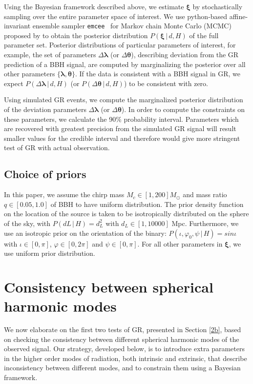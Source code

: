 \documentclass[prd,preprintnumbers,twocolumn,eqsecnum,floatfix,a4paper,nofootinbib,superscriptaddress]{revtex4}
\newcommand{\blambda}{\bm{\lambda}}
\newcommand{\btheta}{\bm{\theta}}
\newcommand{\bxi}{\bm{\xi}}
\begin{document}
Using the Bayesian framework described above, we estimate $\bxi$ by stochastically sampling over the entire parameter space of interest. We use python-based affine-invariant ensemble sampler \texttt{emcee}~\cite{foreman2013emcee} for Markov chain Monte Carlo (MCMC) proposed by \cite{goodman2010ensemble} to obtain the posterior distribution $P(\bxi \, | \, d, H)$ of the full parameter set. Posterior distributions of particular parameters of interest, for example,  the set of parameters ${\Delta \blambda}$ (or ${\Delta \btheta}$), describing deviation from the GR prediction of a BBH signal, are computed  by marginalizing the posterior over all other parameters $\{\blambda, \btheta\}$. If the data is consistent with a BBH signal in GR, we expect $P(\Delta \blambda \, | \, d, H)$ (or $P(\Delta \btheta \, | \, d, H)$) to be consistent with zero. 

Using simulated GR events, we compute the marginalized posterior distribution of the deviation parameters  ${\Delta \blambda}$ (or ${\Delta \btheta}$). In order to compute the constraints on these parameters, we calculate the 90\% probability interval. Parameters which are recovered with greatest precision from the simulated GR signal will result smaller values for the credible interval and therefore would give more stringent test of GR with actual observation.

\subsection{Choice of priors}
In this paper, we assume the chirp mass $M_c \in [1,200] M_\odot$ and mass ratio $q \in [0.05,1.0]$ of BBH to have uniform distribution. The prior density function on the location of the source is  taken  to  be  isotropically  distributed  on  the  sphere of  the  sky,  with $P({dL} \, | \, H)=d_{L}^{2}$ with $d_L \in [1,10000]$ Mpc. Furthermore, we use an  isotropic  prior  on  the  orientation  of  the  binary: $P({\iota,\varphi_0,\psi} \, | \, H)=sin\iota$ with $\iota \in [0,\pi]$, $\varphi \in [0,2\pi]$ and $\psi \in [0,\pi]$. For all other parameters in $\bxi$, we use uniform prior distribution. 


\section{Consistency between spherical harmonic modes}
\label{sec3}
We now elaborate on the first two tests of GR, presented in Section \ref{2b}, based on checking the consistency between different spherical harmonic modes of the observed signal. Our strategy, developed below, is to introduce extra parameters in the higher order modes of radiation, both intrinsic and extrinsic, that describe inconsistency between different modes, and to constrain them using a Bayesian framework. 
\end{document}
